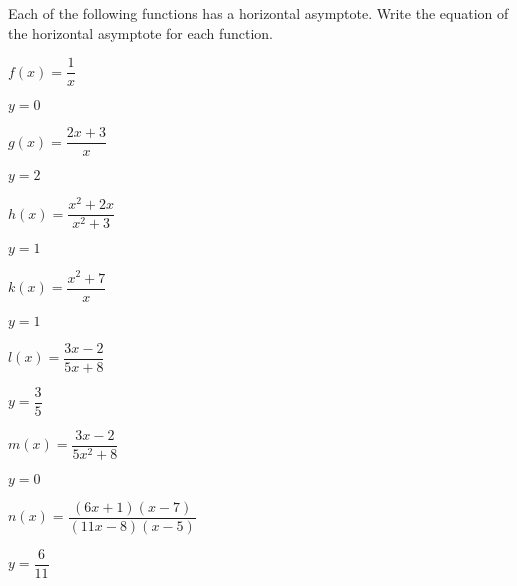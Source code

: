 \begin{exercises}
\begin{problem}
Each of the following functions has a horizontal asymptote. Write the equation
of the horizontal asymptote for each function.
\begin{multicols}{3}
    \begin{subproblem}
        $f(x) = \dfrac{1}{x}$
        \begin{shortsolution}
         $y=0$
        \end{shortsolution}
    \end{subproblem}
    \begin{subproblem}
        $g(x) = \dfrac{2x+3}{x}$
        \begin{shortsolution}
            $y=2$
        \end{shortsolution}
    \end{subproblem}
    \begin{subproblem}
        $h(x) = \dfrac{x^2+2x}{x^2+3}$
        \begin{shortsolution}
         $y=1$
        \end{shortsolution}
    \end{subproblem}
    \begin{subproblem}
        $k(x) = \dfrac{x^2+7}{x}$
        \begin{shortsolution}
         $y=1$
        \end{shortsolution}
    \end{subproblem}
    \begin{subproblem}
         $l(x)=\dfrac{3x-2}{5x+8}$ 
        \begin{shortsolution}
         $y=\dfrac{3}{5}$
        \end{shortsolution}
    \end{subproblem}
    \begin{subproblem}
         $m(x)=\dfrac{3x-2}{5x^2+8}$ 
        \begin{shortsolution}
        $y=0$
        \end{shortsolution}
    \end{subproblem}
    \begin{subproblem}
        $n(x)=\dfrac{(6x+1)(x-7)}{(11x-8)(x-5)}$ 
        \begin{shortsolution}
         $y=\dfrac{6}{11}$
        \end{shortsolution}
    \end{subproblem}

\end{multicols}
\end{problem}
\end{exercises}

